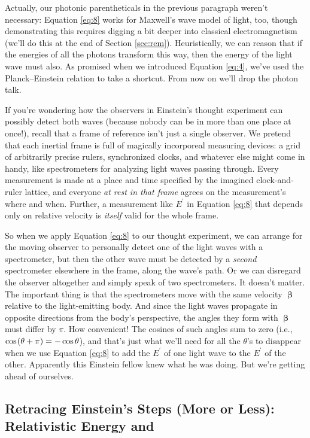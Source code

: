 \documentclass[12pt]{article}
\newcommand{\vvbeta}{\bm{\upbeta}}
\begin{document}
Actually, our photonic parentheticals in the previous paragraph weren't necessary: Equation \ref{eq:8} works for Maxwell's wave model of light, too, though demonstrating this requires digging a bit deeper into classical electromagnetism (we'll do this at the end of Section \ref{sec:rem}). Heuristically, we can reason that if the energies of all the photons transform this way, then the energy of the light wave must also. As promised when we introduced Equation \ref{eq:4}, we've used the Planck--Einstein relation to take a shortcut. From now on we'll drop the photon talk.

If you're wondering how the observers in Einstein's thought experiment can possibly detect both waves (because nobody can be in more than one place at once!), recall that a frame of reference isn't just a single observer. We pretend that each inertial frame is full of magically incorporeal measuring devices: a grid of arbitrarily precise rulers, synchronized clocks, and whatever else might come in handy, like spectrometers for analyzing light waves passing through. Every measurement is made at a place and time specified by the imagined clock-and-ruler lattice, and everyone \emph{at rest in that frame} agrees on the measurement's where and when. Further, a measurement like $E^\prime$ in Equation \ref{eq:8} that depends only on relative velocity is \emph{itself} valid for the whole frame.

So when we apply Equation \ref{eq:8} to our thought experiment, we can arrange for the moving observer to personally detect one of the light waves with a spectrometer, but then the other wave must be detected by a \emph{second} spectrometer elsewhere in the frame, along the wave's path. Or we can disregard the observer altogether and simply speak of two spectrometers. It doesn't matter. The important thing is that the spectrometers move with the same velocity $\vvbeta$ relative to the light-emitting body. And since the light waves propagate in opposite directions from the body's perspective, the angles they form with $\vvbeta$ must differ by $\pi$. How convenient! The cosines of such angles sum to zero (i.e., $\cos \mkern1.5mu (\theta+\pi)=-\cos\theta$), and that's just what we'll need for all the $\theta$'s to disappear when we use Equation \ref{eq:8} to add the $E^{\prime}$ of one light wave to the $E^{\prime}$ of the other. Apparently this Einstein fellow knew what he was doing. But we're getting ahead of ourselves.

\subsection [Retracing Einstein's Steps (More or Less): Relativistic Energy and $m=E_0/c^2$] {Retracing Einstein's Steps (More or Less):\\Relativistic Energy and }\label{ssec:re}
\end{document}
